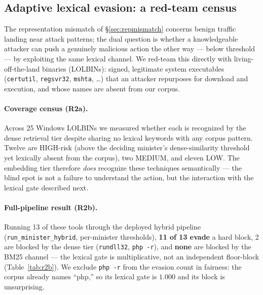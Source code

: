 %

\subsection{Adaptive lexical evasion: a red-team census}
\label{sec:lolbin}
The representation mismatch of \S\ref{sec:repmismatch} concerns benign traffic
landing near attack patterns; the dual question is whether a knowledgeable
attacker can push a genuinely malicious action the other way --- below
threshold --- by exploiting the same lexical channel. We red-team this directly
with living-off-the-land binaries (LOLBINs): signed, legitimate system
executables (\texttt{certutil}, \texttt{regsvr32}, \texttt{mshta}, \dots) that
an attacker repurposes for download and execution, and whose names are absent
from our corpus.

\paragraph{Coverage census (R2a).} Across 25 Windows LOLBINs we measured whether
each is recognized by the dense retrieval tier despite sharing no lexical
keywords with any corpus pattern. Twelve are HIGH-risk (above the deciding
minister's dense-similarity threshold yet lexically absent from the corpus), two
MEDIUM, and eleven LOW. The embedding tier therefore \emph{does} recognize these
techniques semantically --- the blind spot is not a failure to understand the
action, but the interaction with the lexical gate described next.

\paragraph{Full-pipeline result (R2b).} Running 13 of these tools through the
deployed hybrid pipeline (\texttt{run\_minister\_hybrid}, per-minister
thresholds), \textbf{11 of 13 evade} a hard block, 2 are blocked by the dense
tier (\texttt{rundll32}, \texttt{php\,-r}), and \textbf{none} are blocked by the
BM25 channel --- the lexical gate is multiplicative, not an independent
floor-block (Table~\ref{tab:r2b}). We exclude \texttt{php\,-r} from the evasion
count in fairness: the corpus already names ``php,'' so its lexical gate is
$1.000$ and its block is unsurprising.

